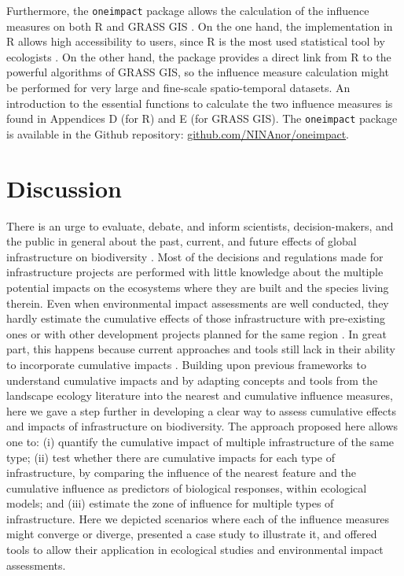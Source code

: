 \documentclass[titlepage]{article}
\begin{document}
Furthermore, the \verb|oneimpact| package allows the calculation of the influence measures on both R \citep{r_core_team_r_2020} and GRASS GIS \citep{grass_development_team_geographic_2017}. On the one hand, the implementation in R allows high accessibility to users, since R is the most used statistical tool by ecologists \citep{lai_evaluating_2019}. On the other hand, the package provides a direct link from R to the powerful algorithms of GRASS GIS, so the influence measure calculation might be performed for very large and fine-scale spatio-temporal datasets. An introduction to the essential functions to calculate the two influence measures is found in Appendices D (for R) and E (for GRASS GIS). The \verb|oneimpact| package is available in the Github repository: \url{github.com/NINAnor/oneimpact}.


\section{Discussion}

There is an urge to evaluate, debate, and inform scientists, decision-makers, and the public 
in general about the past, current, and future effects of global infrastructure on biodiversity
\citep{laurance_conservation_2018}. Most of the decisions and regulations made for infrastructure
projects are performed with little knowledge about the multiple potential impacts on the ecosystems
where they are built and the species living therein. Even when environmental impact assessments are
well conducted, they hardly estimate the cumulative effects of those infrastructure with
pre-existing ones or with other development projects planned for the same region
\citep{laurance_roads_2017, krausman_cumulative_2011}. In great part, this happens 
because current approaches and tools still lack in their ability to incorporate 
cumulative impacts \citep[but see][for recent advances]{gillingham_integration_2016}. 
Building upon previous frameworks to understand cumulative impacts \citep{naugle_unifying_2011} 
and by adapting concepts and tools from the landscape ecology literature into the nearest 
and cumulative influence measures, here we gave a step further in developing a clear way to 
assess cumulative effects and impacts of infrastructure on biodiversity. 
The approach proposed here allows one to: (i) quantify the cumulative impact of 
multiple infrastructure of the same type; (ii) test whether there are cumulative 
impacts for each type of infrastructure, by comparing the influence of the nearest 
feature and the cumulative influence as predictors of biological responses, within 
ecological models; and (iii) estimate the zone of influence for multiple types of 
infrastructure. Here we depicted scenarios where each of the influence measures 
might converge or diverge, presented a case study to illustrate it, and offered tools 
to allow their application in ecological studies and environmental impact assessments.
\end{document}
